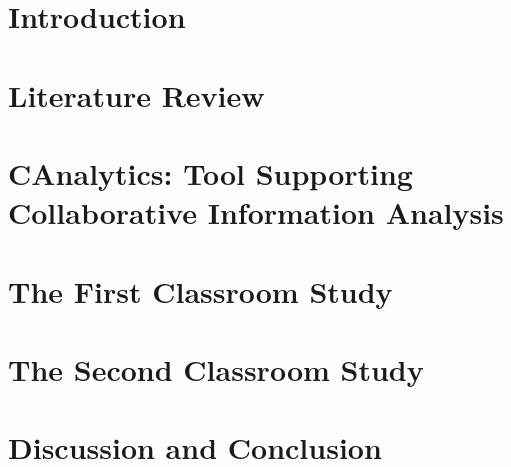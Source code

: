 \documentclass[11pt]{psuthesis}
\begin{document}


\chapter{Introduction}


\chapter{Literature Review}




\chapter{CAnalytics: Tool Supporting \\ Collaborative Information Analysis}






\chapter{The First Classroom Study}







\chapter{The Second Classroom Study}






\chapter{Discussion and Conclusion}



\end{document}

